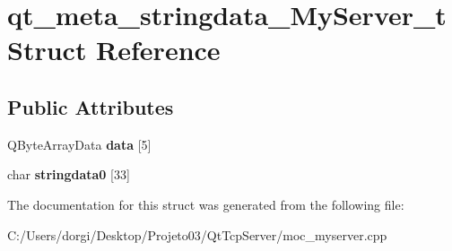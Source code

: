 \hypertarget{structqt__meta__stringdata___my_server__t}{}\section{qt\+\_\+meta\+\_\+stringdata\+\_\+\+My\+Server\+\_\+t Struct Reference}
\label{structqt__meta__stringdata___my_server__t}
\subsection*{Public Attributes}
\begin{DoxyCompactItemize}
\item 
\mbox{\label{structqt__meta__stringdata___my_server__t_ab15722048201cc80be7f2b05eece64e9}} 
Q\+Byte\+Array\+Data {\bfseries data} \mbox{[}5\mbox{]}
\item 
\mbox{\label{structqt__meta__stringdata___my_server__t_a54652770c5771b1f6db92acb7932b3dd}} 
char {\bfseries stringdata0} \mbox{[}33\mbox{]}
\end{DoxyCompactItemize}


The documentation for this struct was generated from the following file\+:\begin{DoxyCompactItemize}
\item 
C\+:/\+Users/dorgi/\+Desktop/\+Projeto03/\+Qt\+Tcp\+Server/moc\+\_\+myserver.\+cpp\end{DoxyCompactItemize}

